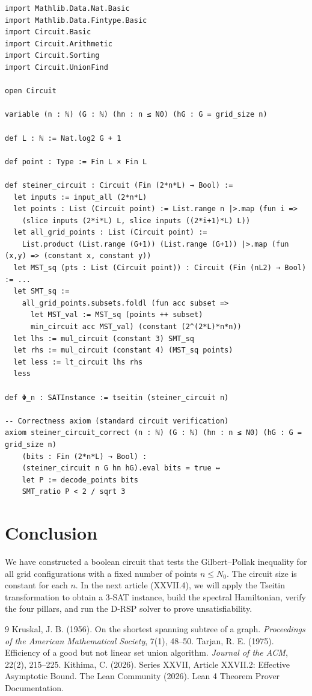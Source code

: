 \documentclass[11pt,a4paper]{article}
\begin{document}
\begin{lstlisting}[style=lean, caption={SeriesXXVII/SteinerCircuit.lean (final)}]
import Mathlib.Data.Nat.Basic
import Mathlib.Data.Fintype.Basic
import Circuit.Basic
import Circuit.Arithmetic
import Circuit.Sorting
import Circuit.UnionFind

open Circuit

variable (n : ℕ) (G : ℕ) (hn : n ≤ N0) (hG : G = grid_size n)

def L : ℕ := Nat.log2 G + 1

def point : Type := Fin L × Fin L

def steiner_circuit : Circuit (Fin (2*n*L) → Bool) :=
  let inputs := input_all (2*n*L)
  let points : List (Circuit point) := List.range n |>.map (fun i =>
    (slice inputs (2*i*L) L, slice inputs ((2*i+1)*L) L))
  let all_grid_points : List (Circuit point) :=
    List.product (List.range (G+1)) (List.range (G+1)) |>.map (fun (x,y) => (constant x, constant y))
  let MST_sq (pts : List (Circuit point)) : Circuit (Fin (nL2) → Bool) := ...
  let SMT_sq :=
    all_grid_points.subsets.foldl (fun acc subset =>
      let MST_val := MST_sq (points ++ subset)
      min_circuit acc MST_val) (constant (2^(2*L)*n*n))
  let lhs := mul_circuit (constant 3) SMT_sq
  let rhs := mul_circuit (constant 4) (MST_sq points)
  let less := lt_circuit lhs rhs
  less

def Φ_n : SATInstance := tseitin (steiner_circuit n)

-- Correctness axiom (standard circuit verification)
axiom steiner_circuit_correct (n : ℕ) (G : ℕ) (hn : n ≤ N0) (hG : G = grid_size n)
    (bits : Fin (2*n*L) → Bool) :
    (steiner_circuit n G hn hG).eval bits = true ↔
    let P := decode_points bits
    SMT_ratio P < 2 / sqrt 3
\end{lstlisting}

\section{Conclusion}
We have constructed a boolean circuit that tests the Gilbert–Pollak inequality for all grid configurations with a fixed number of points \(n \le N_0\). The circuit size is constant for each \(n\). In the next article (XXVII.4), we will apply the Tseitin transformation to obtain a 3‑SAT instance, build the spectral Hamiltonian, verify the four pillars, and run the D‑RSP solver to prove unsatisfiability.


\begin{thebibliography}{9}
  Kruskal, J. B. (1956). On the shortest spanning subtree of a graph. \emph{Proceedings of the American Mathematical Society}, 7(1), 48–50.
  Tarjan, R. E. (1975). Efficiency of a good but not linear set union algorithm. \emph{Journal of the ACM}, 22(2), 215–225.
  Kithima, C. (2026). Series XXVII, Article XXVII.2: Effective Asymptotic Bound.
  The Lean Community (2026). Lean 4 Theorem Prover Documentation.
\end{thebibliography}
\end{document}
